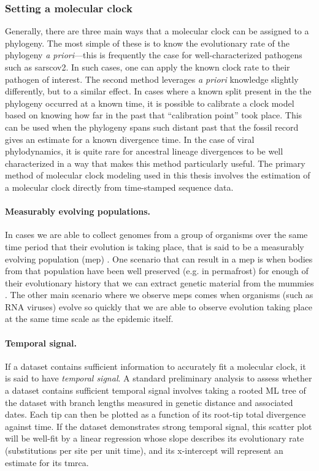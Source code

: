 \subsubsection{Setting a molecular clock}
Generally, there are three main ways that a molecular clock can be assigned to a phylogeny.
The most simple of these is to know the evolutionary rate of the phylogeny \textit{a priori}---this is frequently the case for well-characterized pathogens such as \gls{sarscov2}.
In such cases, one can apply the known clock rate to their pathogen of interest.
The second method leverages \textit{a priori} knowledge slightly differently, but to a similar effect.
In cases where a known split present in the the phylogeny occurred at a known time, it is possible to calibrate a clock model based on knowing how far in the past that ``calibration point'' took place.
This can be used when the phylogeny spans such distant past that the fossil record gives an estimate for a known divergence time.
In the case of viral phylodynamics, it is quite rare for ancestral lineage divergences to be well characterized in a way that makes this method particularly useful.
The primary method of molecular clock modeling used in this thesis involves the estimation of a molecular clock directly from time-stamped sequence data.

\paragraph*{Measurably evolving populations.}
In cases we are able to collect genomes from a group of organisms over the same time period that their evolution is taking place, that is said to be a measurably evolving population (\gls{mep}) \cite{drummond2003measurably}.
One scenario that can result in a \gls{mep} is when bodies from that population have been well preserved (e.g. in permafrost) for enough of their evolutionary history that we can extract genetic material from the mummies \citep{shapiro2004rise}.
The other main scenario where we observe \gls{mep}s comes when organisms (such as RNA viruses) evolve so quickly that we are able to observe evolution taking place at the same time scale as the epidemic itself.

\paragraph*{Temporal signal.}
If a dataset contains sufficient information to accurately fit a molecular clock, it is said to have \textit{temporal signal}.
A standard preliminary analysis to assess whether a dataset contains sufficient temporal signal involves taking a rooted ML tree of the dataset with branch lengths measured in genetic distance and associated dates.
Each tip can then be plotted as a function of its root-tip total divergence against time.
If the dataset demonstrates strong temporal signal, this scatter plot will be well-fit by a linear regression whose slope describes its evolutionary rate (substitutions per site per unit time), and its x-intercept will represent an estimate for its \gls{tmrca}.

